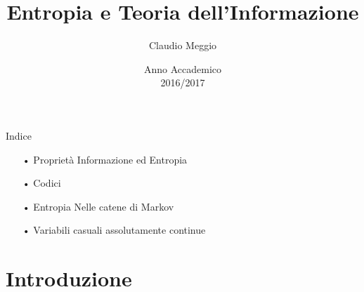 \documentclass{beamer}
\theoremstyle{definition}
\numberwithin{equation}{section}
\newcommand{\spacep}{$(\Omega,\mathcal{F} ,\mathbb{P})$}
\begin{document}
\title{Entropia e Teoria dell'Informazione}
\author{Claudio Meggio}
\date{Anno Accademico\\2016/2017}



\begin{frame}
\titlepage 
\end{frame}


\begin{frame}[t]{Indice}
\vspace{40pt}
\begin{enumerate}
\item[•] Proprietà Informazione ed Entropia
\item[•] Codici
\item[•] Entropia Nelle catene di Markov
\item[•] Variabili casuali assolutamente continue
\end{enumerate}
\end{frame}


\section{Introduzione}


\end{document}
